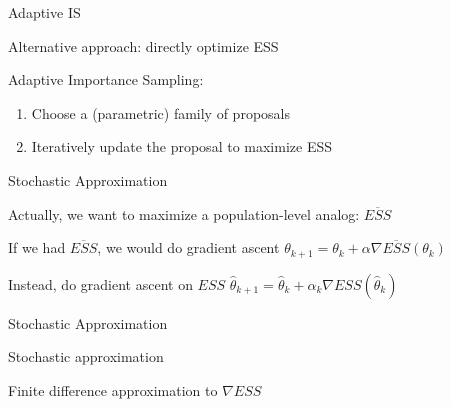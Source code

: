 \documentclass[14pt]{beamer}
\begin{document}
\begin{frame}{Adaptive IS}
    \begin{outline}
        \1 Alternative approach: directly optimize ESS \newline

        \1 Adaptive Importance Sampling: 
            \2 \citep{Aky21} \newline
    \end{outline}

    \begin{enumerate}
        [default]
        \item Choose a (parametric) family of proposals
        \item Iteratively update the proposal to maximize ESS
    \end{enumerate}
\end{frame}

\begin{frame}{Stochastic Approximation}
    \begin{outline}
        \1 Actually, we want to maximize a population-level analog: $\overline{ESS}$ \newline

        \1 If we had $\overline{ESS}$, we would do gradient ascent
            \2 $\theta_{k+1} = \theta_k + \alpha \nabla \overline{ESS}(\theta_k)$ \newline

        \1 Instead, do gradient ascent on $ESS$
            \2 $\hat{\theta}_{k+1} = \hat{\theta}_k + \alpha_k \nabla ESS(\hat{\theta}_k)$
    \end{outline}
\end{frame}

\begin{frame}{Stochastic Approximation}
    \begin{outline}
        \1 Stochastic approximation
            \2 \citep{Rob51} \newline

        \1 Finite difference approximation to  $\nabla ESS$
            \2 \citep{Kie52}
    \end{outline}
\end{frame}
\end{document}
